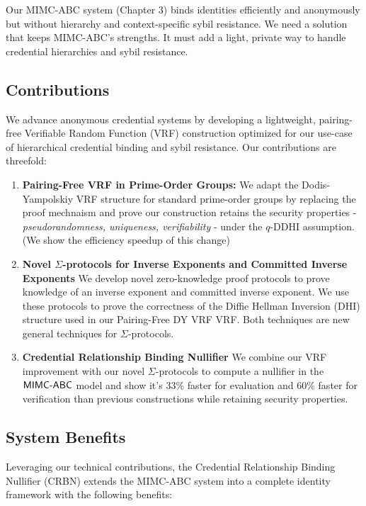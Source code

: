 Our MIMC-ABC system (Chapter 3) binds identities efficiently and anonymously but without hierarchy and context-specific sybil resistance. We need a solution that keeps MIMC-ABC’s strengths. It must add a light, private way to handle credential hierarchies and sybil resistance.




\subsection{Contributions}

We advance anonymous credential systems by developing a lightweight, pairing-free Verifiable Random Function (VRF) construction optimized for our use-case of hierarchical credential binding and sybil resistance. Our contributions are threefold:

\begin{enumerate}
        \item \textbf{Pairing-Free VRF in Prime-Order Groups:} We adapt the Dodis-Yampolskiy VRF structure for standard prime-order groups by replacing the proof mechnaism and prove our construction retains the security properties - \emph{pseudorandomness, uniqueness, verifiability} - under the $q$-DDHI assumption. (We show the efficiency speedup of this change)

        \item \textbf{Novel $\Sigma$-protocols for Inverse Exponents and Committed Inverse Exponents} We develop novel zero-knowledge proof protocols to prove knowledge of an inverse exponent and committed inverse exponent.        
        We use these protocols to prove the correctness of the Diffie Hellman Inversion (DHI) structure used in our Pairing-Free DY VRF VRF. Both techniques are new general techniques for $\Sigma$-protocols.
        
        \item \textbf{Credential Relationship Binding Nullifier } We combine our VRF improvement with our novel $\Sigma$-protocols to compute a nullifier in the $\mathsf{MIMC\text{-}ABC}$ model and show it's 33\% faster for evaluation and 60\% faster for verification than previous constructions while retaining security properties.

\end{enumerate}


\subsection{System Benefits}
Leveraging our technical contributions, the Credential Relationship Binding Nullifier (CRBN) extends the MIMC-ABC system into a complete identity framework with the following benefits:

